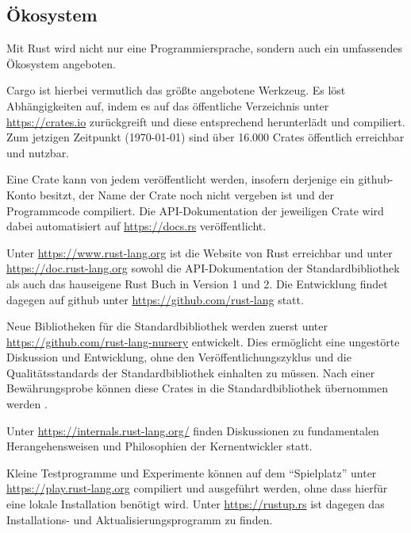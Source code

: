 \subsection{Ökosystem}

Mit Rust wird nicht nur eine Programmiersprache, sondern auch ein umfassendes Ökosystem angeboten.

Cargo ist hierbei vermutlich das größte angebotene Werkzeug.
Es löst Abhängigkeiten auf, indem es auf das öffentliche Verzeichnis unter \url{https://crates.io} zurückgreift und diese entsprechend herunterlädt und compiliert.
Zum jetzigen Zeitpunkt (\today) sind über 16.000 Crates öffentlich erreichbar und nutzbar.

Eine Crate kann von jedem veröffentlicht werden, insofern derjenige ein \gls{github}-Konto besitzt, der Name der Crate noch nicht vergeben ist und der Programmcode compiliert.
Die API-Dokumentation der jeweiligen Crate wird dabei automatisiert auf \url{https://docs.rs} veröffentlicht.

Unter \url{https://www.rust-lang.org} ist die Website von Rust erreichbar und unter \url{https://doc.rust-lang.org} sowohl die API-Dokumentation der Standardbibliothek als auch das hauseigene Rust Buch in Version 1 und 2.
Die Entwicklung findet dagegen auf \gls{github} unter \url{https://github.com/rust-lang} statt.

Neue Bibliotheken für die Standardbibliothek werden zuerst unter \url{https://github.com/rust-lang-nursery} entwickelt.
Dies ermöglicht eine ungestörte Diskussion und Entwicklung, ohne den Veröffentlichungszyklus und die Qualitätsstandards der Standardbibliothek einhalten zu müssen.
Nach einer Bewährungsprobe können diese Crates in die Standardbibliothek übernommen werden \cite{rust:internals:1242_Recap}.

Unter \url{https://internals.rust-lang.org/} finden Diskussionen zu fundamentalen Herangehensweisen und Philosophien der Kernentwickler statt.

Kleine Testprogramme und Experimente können auf dem \enquote{Spielplatz} unter \url{https://play.rust-lang.org} compiliert und ausgeführt werden, ohne dass hierfür eine lokale Installation benötigt wird.
Unter \url{https://rustup.rs} ist dagegen das Installations- und Aktualisierungsprogramm  zu finden.

